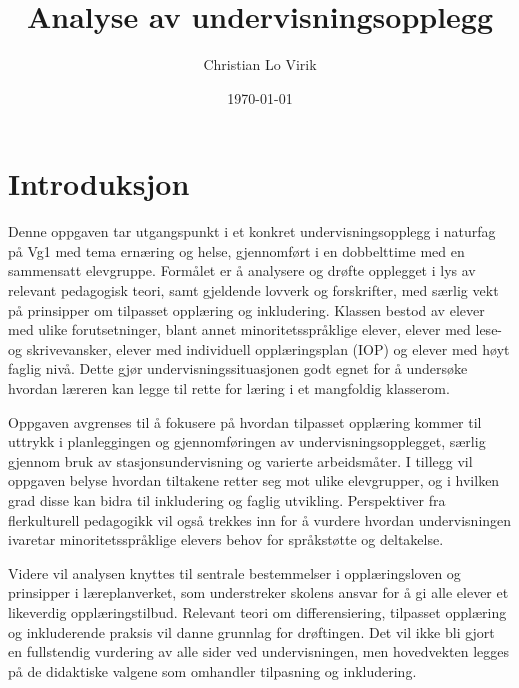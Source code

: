 \documentclass[a4paper,12pt]{article}
\title{Analyse av undervisningsopplegg}
\author{Christian Lo Virik}
\date{\today}
\begin{document}
\maketitle

\newpage
\tableofcontents
\newpage

\hypersetup{
    colorlinks=true,
    linkcolor=red!50!black,        %
    citecolor=red!50!black, %
    urlcolor=blue           %
}





\section{Introduksjon}
Denne oppgaven tar utgangspunkt i et konkret undervisningsopplegg i naturfag på Vg1 med tema ernæring og helse, gjennomført i en dobbelttime med en sammensatt elevgruppe. Formålet er å analysere og drøfte opplegget i lys av relevant pedagogisk teori, samt gjeldende lovverk og forskrifter, med særlig vekt på prinsipper om tilpasset opplæring og inkludering. Klassen bestod av elever med ulike forutsetninger, blant annet minoritetsspråklige elever, elever med lese- og skrivevansker, elever med individuell opplæringsplan (IOP) og elever med høyt faglig nivå. Dette gjør undervisningssituasjonen godt egnet for å undersøke hvordan læreren kan legge til rette for læring i et mangfoldig klasserom.

Oppgaven avgrenses til å fokusere på hvordan tilpasset opplæring kommer til uttrykk i planleggingen og gjennomføringen av undervisningsopplegget, særlig gjennom bruk av stasjonsundervisning og varierte arbeidsmåter. I tillegg vil oppgaven belyse hvordan tiltakene retter seg mot ulike elevgrupper, og i hvilken grad disse kan bidra til inkludering og faglig utvikling. Perspektiver fra flerkulturell pedagogikk vil også trekkes inn for å vurdere hvordan undervisningen ivaretar minoritetsspråklige elevers behov for språkstøtte og deltakelse.

Videre vil analysen knyttes til sentrale bestemmelser i opplæringsloven og prinsipper i læreplanverket, som understreker skolens ansvar for å gi alle elever et likeverdig opplæringstilbud. Relevant teori om differensiering, tilpasset opplæring og inkluderende praksis vil danne grunnlag for drøftingen. Det vil ikke bli gjort en fullstendig vurdering av alle sider ved undervisningen, men hovedvekten legges på de didaktiske valgene som omhandler tilpasning og inkludering.
\end{document}

